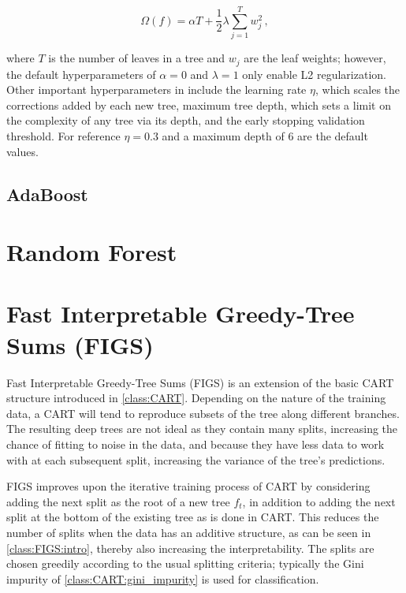 \begin{equation} \label{eq:bdt_omega_reg}
\Omega\left(f\right) = \alpha T + \frac{1}{2}\lambda \sum_{j=1}^T w_{j}^{2}\,,
\end{equation}

\noindent where $T$ is the number of leaves in a tree and $w_{j}$ are the leaf weights;
however, the default hyperparameters of $\alpha=0$ and $\lambda=1$ only enable L2 regularization.
Other important hyperparameters in \xgboost include the
learning rate $\eta$, which scales the corrections added by each new tree,
maximum tree depth, which sets a limit on the complexity of any tree via its depth,
and the early stopping validation threshold.
For reference $\eta=0.3$ and a maximum depth of 6 are the default values.

\subsection{AdaBoost}
\label{class:BDT:AdaBoost}

\section{Random Forest}
\label{class:RF}


\section{Fast Interpretable Greedy-Tree Sums (FIGS)}
\label{class:FIGS}

Fast Interpretable Greedy-Tree Sums (FIGS) \cite{FIGS,G-FIGS}
is an extension of the basic CART structure introduced in \cref{class:CART}.
Depending on the nature of the training data,
a CART will tend to reproduce subsets of the tree along different branches.
The resulting deep trees are not ideal as they contain many splits,
increasing the chance of fitting to noise in the data,
and because they have less data to work with at each subsequent split,
increasing the variance of the tree's predictions.

FIGS improves upon the iterative training process of CART
by considering adding the next split as the root of a new tree $f_{t}$,
in addition to adding the next split at the bottom of the existing tree as is done in CART.
This reduces the number of splits when the data has an additive structure,
as can be seen in \cref{class:FIGS:intro}, thereby also increasing the interpretability.
The splits are chosen greedily according to the usual splitting criteria;
typically the Gini impurity of \cref{class:CART:gini_impurity} is used for classification.


